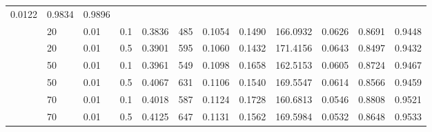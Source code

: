 \begin{table}[H]
{\begin{tabular}{llllrrrrrrrr}
{\cellcolor[HTML]{C3C3F5}} \color[HTML]{000000} 0.0122 & {\cellcolor[HTML]{1919FE}} \color[HTML]{F1F1F1} 0.9834 & {\cellcolor[HTML]{2B2BFD}} \color[HTML]{F1F1F1} 0.9896 \\ & 20 & 0.01 & 0.1 & {\cellcolor[HTML]{2929FD}} \color[HTML]{F1F1F1} 0.3836 & {\cellcolor[HTML]{9696F7}} \color[HTML]{F1F1F1} 485 & {\cellcolor[HTML]{2626FD}} \color[HTML]{F1F1F1} 0.1054 & {\cellcolor[HTML]{3D3DFC}} \color[HTML]{F1F1F1} 0.1490 & {\cellcolor[HTML]{CECEF5}} \color[HTML]{000000} 166.0932 & {\cellcolor[HTML]{0606FF}} \color[HTML]{F1F1F1} 0.0626 & {\cellcolor[HTML]{D1D1F4}} \color[HTML]{000000} 0.8691 & {\cellcolor[HTML]{EAEAF3}} \color[HTML]{000000} 0.9448 \\ & 20 & 0.01 & 0.5 & {\cellcolor[HTML]{2020FD}} \color[HTML]{F1F1F1} 0.3901 & {\cellcolor[HTML]{6262FA}} \color[HTML]{F1F1F1} 595 & {\cellcolor[HTML]{2323FD}} \color[HTML]{F1F1F1} 0.1060 & {\cellcolor[HTML]{4B4BFB}} \color[HTML]{F1F1F1} 0.1432 & {\cellcolor[HTML]{ABABF6}} \color[HTML]{000000} 171.4156 & {\cellcolor[HTML]{0000FF}} \color[HTML]{F1F1F1} 0.0643 & {\cellcolor[HTML]{F0F0F3}} \color[HTML]{000000} 0.8497 & {\cellcolor[HTML]{F0F0F3}} \color[HTML]{000000} 0.9432 \\& 50 & 0.01 & 0.1 & {\cellcolor[HTML]{1818FE}} \color[HTML]{F1F1F1} 0.3961 & {\cellcolor[HTML]{7878F9}} \color[HTML]{F1F1F1} 549 & {\cellcolor[HTML]{1010FE}} \color[HTML]{F1F1F1} 0.1098 & {\cellcolor[HTML]{1212FE}} \color[HTML]{F1F1F1} 0.1658 & {\cellcolor[HTML]{E5E5F3}} \color[HTML]{000000} 162.5153 & {\cellcolor[HTML]{0E0EFE}} \color[HTML]{F1F1F1} 0.0605 & {\cellcolor[HTML]{CDCDF5}} \color[HTML]{000000} 0.8724 & {\cellcolor[HTML]{E2E2F3}} \color[HTML]{000000} 0.9467 \\ & 50 & 0.01 & 0.5 & {\cellcolor[HTML]{0808FF}} \color[HTML]{F1F1F1} 0.4067 & {\cellcolor[HTML]{5151FB}} \color[HTML]{F1F1F1} 631 & {\cellcolor[HTML]{0C0CFE}} \color[HTML]{F1F1F1} 0.1106 & {\cellcolor[HTML]{3030FD}} \color[HTML]{F1F1F1} 0.1540 & {\cellcolor[HTML]{B7B7F6}} \color[HTML]{000000} 169.5547 & {\cellcolor[HTML]{0A0AFE}} \color[HTML]{F1F1F1} 0.0614 & {\cellcolor[HTML]{E6E6F3}} \color[HTML]{000000} 0.8566 & {\cellcolor[HTML]{E5E5F3}} \color[HTML]{000000} 0.9459 \\ & 70 & 0.01 & 0.1 & {\cellcolor[HTML]{0F0FFE}} \color[HTML]{F1F1F1} 0.4018 & {\cellcolor[HTML]{6666FA}} \color[HTML]{F1F1F1} 587 & {\cellcolor[HTML]{0303FF}} \color[HTML]{F1F1F1} 0.1124 & {\cellcolor[HTML]{0000FF}} \color[HTML]{F1F1F1} 0.1728 & {\cellcolor[HTML]{F0F0F3}} \color[HTML]{000000} 160.6813 & {\cellcolor[HTML]{2424FD}} \color[HTML]{F1F1F1} 0.0546 & {\cellcolor[HTML]{BEBEF5}} \color[HTML]{000000} 0.8808 & {\cellcolor[HTML]{CBCBF5}} \color[HTML]{000000} 0.9521 \\ & 70 & 0.01 & 0.5 & {\cellcolor[HTML]{0000FF}} \color[HTML]{F1F1F1} 0.4125 & {\cellcolor[HTML]{4949FB}} \color[HTML]{F1F1F1} 647 & {\cellcolor[HTML]{0000FF}} \color[HTML]{F1F1F1} 0.1131 & {\cellcolor[HTML]{2A2AFD}} \color[HTML]{F1F1F1} 0.1562 & {\cellcolor[HTML]{B7B7F6}} \color[HTML]{000000} 169.5984 & {\cellcolor[HTML]{2929FD}} \color[HTML]{F1F1F1} 0.0532 & {\cellcolor[HTML]{D9D9F4}} \color[HTML]{000000} 0.8648 & {\cellcolor[HTML]{C6C6F5}} \color[HTML]{000000} 0.9533 \\

\end{tabular}}
\end{table}
